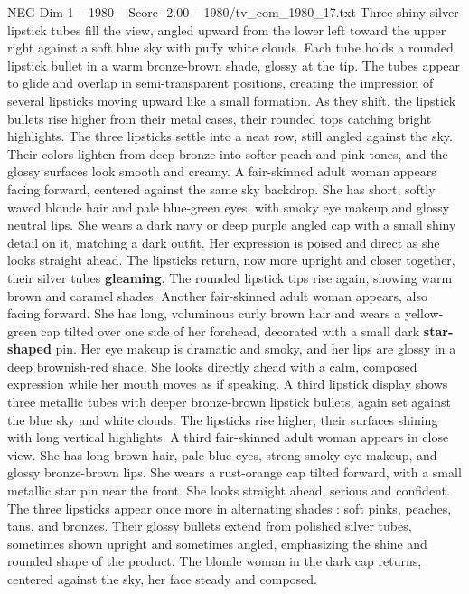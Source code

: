 \begin{textsample}{NEG Dim 1 – 1980 – Score -2.00 – 1980/tv\_com\_1980\_17.txt}  \label{ex:f1_neg_044}
Three shiny silver lipstick tubes fill the view, angled upward from the lower left toward the upper right against a soft blue sky with puffy white clouds.
Each tube holds a rounded lipstick bullet in a warm bronze-brown shade, glossy at the tip.
The tubes appear to glide and overlap in semi-transparent positions, creating the impression of several lipsticks moving upward like a small formation.
As they shift, the lipstick bullets rise higher from their metal cases, their rounded tops catching bright highlights.
The three lipsticks settle into a neat row, still angled against the sky.
Their colors lighten from deep bronze into softer peach and pink tones, and the glossy surfaces look smooth and creamy.
A fair-skinned adult woman appears facing forward, centered against the same sky backdrop.
She has short, softly waved blonde hair and pale blue-green eyes, with smoky eye makeup and glossy neutral lips.
She wears a dark navy or deep purple angled cap with a small shiny detail on it, matching a dark outfit.
Her expression is poised and direct as she looks straight ahead.
The lipsticks return, now more upright and closer together, their silver tubes \textbf{gleaming}.
The rounded lipstick tips rise again, showing warm brown and caramel shades.
Another fair-skinned adult woman appears, also facing forward.
She has long, voluminous curly brown hair and wears a yellow-green cap tilted over one side of her forehead, decorated with a small dark \textbf{star-shaped} pin.
Her eye makeup is dramatic and smoky, and her lips are glossy in a deep brownish-red shade.
She looks directly ahead with a calm, composed expression while her mouth moves as if speaking.
A third lipstick display shows three metallic tubes with deeper bronze-brown lipstick bullets, again set against the blue sky and white clouds.
The lipsticks rise higher, their surfaces shining with long vertical highlights.
A third fair-skinned adult woman appears in close view.
She has long brown hair, pale blue eyes, strong smoky eye makeup, and glossy bronze-brown lips.
She wears a rust-orange cap tilted forward, with a small metallic star pin near the front.
She looks straight ahead, serious and confident.
The three lipsticks appear once more in alternating shades : soft pinks, peaches, tans, and bronzes.
Their glossy bullets extend from polished silver tubes, sometimes shown upright and sometimes angled, emphasizing the shine and rounded shape of the product.
The blonde woman in the dark cap returns, centered against the sky, her face steady and composed.

\end{textsample}
